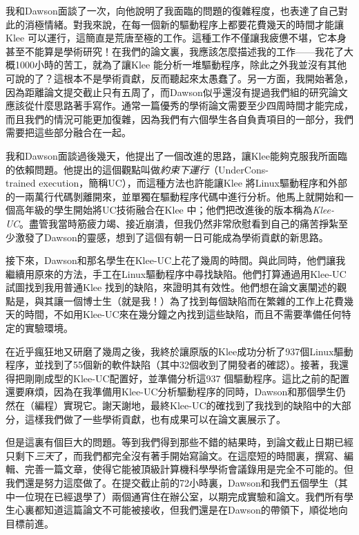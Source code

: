 \documentclass[12pt,UTF8,nofonts]{book}
\begin{document}
我和Dawson面談了一次，向他說明了我面臨的問題的復雜程度，也表達了自己對此的消極情緒。對我來說，在每一個新的驅動程序上都要花費幾天的時間才能讓Klee 可以運行，這簡直是荒唐至極的工作。這種工作不僅讓我疲憊不堪，它本身甚至不能算是學術研究！在我們的論文裏，我應該怎麼描述我的工作——我花了大概1000小時的苦工，就為了讓Klee 能分析一堆驅動程序，除此之外我並沒有其他可說的了？這根本不是學術貢獻，反而聽起來太愚蠢了。另一方面，我開始著急，因為距離論文提交截止只有五周了，而Dawson似乎還沒有提過我們組的研究論文應該從什麼思路著手寫作。通常一篇優秀的學術論文需要至少四周時間才能完成，而且我們的情況可能更加復雜，因為我們有六個學生各自負責項目的一部分，我們需要把這些部分融合在一起。

我和Dawson面談過後幾天，他提出了一個改進的思路，讓Klee能夠克服我所面臨的依賴問題。他提出的這個觀點叫做\emph{約束下運行}（UnderCons-\\trained execution，簡稱UC），而這種方法也許能讓Klee 將Linux驅動程序和外部的一兩萬行代碼剝離開來，並單獨在驅動程序代碼中進行分析。他馬上就開始和一個高年級的學生開始將UC技術融合在Klee 中；他們把改進後的版本稱為\emph{Klee-UC}。盡管我當時筋疲力竭、接近崩潰，但我仍然非常欣慰看到自己的痛苦掙紮至少激發了Dawson的靈感，想到了這個有朝一日可能成為學術貢獻的新思路。

接下來，Dawson和那名學生在Klee-UC上花了幾周的時間。與此同時，他們讓我繼續用原來的方法，手工在Linux驅動程序中尋找缺陷。他們打算通過用Klee-UC試圖找到我用普通Klee 找到的缺陷，來證明其有效性。他們想在論文裏闡述的觀點是，與其讓一個博士生（就是我！）為了找到每個缺陷而在繁雜的工作上花費幾天的時間，不如用Klee-UC來在幾分鐘之內找到這些缺陷，而且不需要準備任何特定的實驗環境。

在近乎瘋狂地又研磨了幾周之後，我終於讓原版的Klee成功分析了937個Linux驅動程序，並找到了55個新的軟件缺陷（其中32個收到了開發者的確認）。接著，我還得把剛剛成型的Klee-UC配置好，並準備分析這937 個驅動程序。這比之前的配置還要麻煩，因為在我準備用Klee-UC分析驅動程序的同時，Dawson和那個學生仍然在（編程）實現它。謝天謝地，最終Klee-UC的確找到了我找到的缺陷中的大部分，這樣我們做了一些學術貢獻，也有成果可以在論文裏展示了。

但是這裏有個巨大的問題。等到我們得到那些不錯的結果時，到論文截止日期已經只剩下\emph{三天}了，而我們都完全沒有著手開始寫論文。在這麼短的時間裏，撰寫、編輯、完善一篇文章，使得它能被頂級計算機科學學術會議錄用是完全不可能的。但我們還是努力這麼做了。在提交截止前的72小時裏，Dawson和我們五個學生（其中一位現在已經退學了）兩個通宵住在辦公室，以期完成實驗和論文。我們所有學生心裏都知道這篇論文不可能被接收，但我們還是在Dawson的帶領下，順從地向目標前進。
\end{document}
